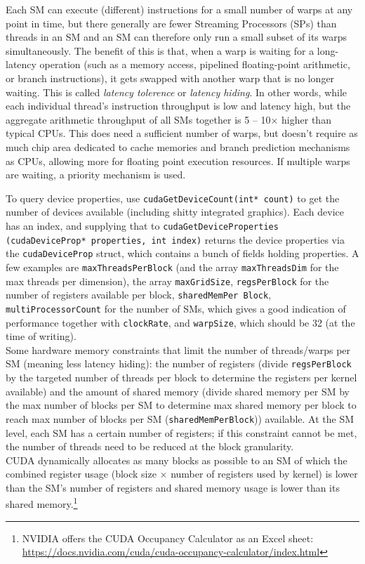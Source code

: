 \documentclass[table, xcdraw]{article}%
\begin{document}
Each SM can execute (different) instructions for a small number of warps at any point in time, but there generally are fewer Streaming Processors (SPs) than threads in an SM and an SM can therefore only run a small subset of its warps simultaneously. The benefit of this is that, when a warp is waiting for a long-latency operation (such as a memory access, pipelined floating-point arithmetic, or branch instructions), it gets swapped with another warp that is no longer waiting. This is called \emph{latency tolerence} or \emph{latency hiding}. In other words, while each individual thread's instruction throughput is low and latency high, but the aggregate arithmetic throughput of all SMs together is 5 – 10× higher than typical CPUs. This does need a sufficient number of warps, but doesn't require as much chip area dedicated to cache memories and branch prediction mechanisms as CPUs, allowing more for floating point execution resources. If multiple warps are waiting, a priority mechanism is used.

To query device properties, use \texttt{cudaGetDeviceCount(int* count)} to get the number of devices available (including shitty integrated graphics). Each device has an index, and supplying that to \texttt{cudaGetDeviceProperties (cudaDeviceProp* properties, int index)} returns the device properties via the \texttt{cudaDeviceProp} struct, which contains a bunch of fields holding properties. A few examples are \texttt{maxThreadsPerBlock} (and the array \texttt{maxThreadsDim} for the max threads per dimension), the array \texttt{maxGridSize}, \texttt{regsPerBlock} for the number of registers available per block, \texttt{sharedMemPer Block}, \texttt{multiProcessorCount} for the number of SMs, which gives a good indication of performance together with \texttt{clockRate}, and \texttt{warpSize}, which should be 32 (at the time of writing).\\
Some hardware memory constraints that limit the number of threads/warps per SM (meaning less latency hiding): the number of registers (divide \texttt{regsPerBlock} by the targeted number of threads per block to determine the registers per kernel available) and the amount of shared memory (divide shared memory per SM by the max number of blocks per SM to determine max shared memory per block to reach max number of blocks per SM (\texttt{sharedMemPerBlock})) available. At the SM level, each SM has a certain number of registers; if this constraint cannot be met, the number of threads need to be reduced at the block granularity.\\
CUDA dynamically allocates as many blocks as possible to an SM of which the combined register usage (block size $\times$ number of registers used by kernel) is lower than the SM's number of registers and shared memory usage is lower than its shared memory.\footnote{NVIDIA offers the CUDA Occupancy Calculator as an Excel sheet: \url{https://docs.nvidia.com/cuda/cuda-occupancy-calculator/index.html}}
\end{document}
